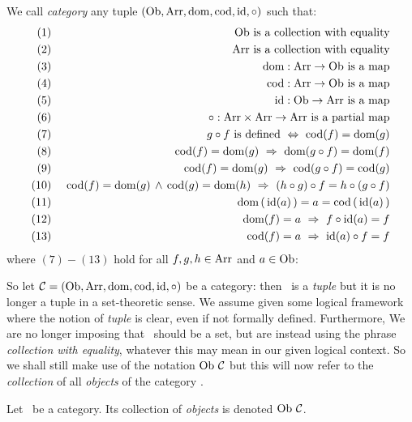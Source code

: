 \begin{defin}\label{Cat:def:category}
    We call {\em category} any tuple $(\mbox{\rm Ob}, \mbox{\rm Arr}, \mbox{\rm dom}, \mbox{\rm cod}, \mbox{\rm id}, \circ)$ 
    such that:
        \begin{eqnarray*}
            (1)&\ &\mbox{\rm Ob}\mbox{\ is a collection with equality}\\
            (2)&\ &\mbox{\rm Arr}\mbox{\ is a collection with equality}\\
            (3)&\ &\mbox{\rm dom}:\mbox{\rm Arr}\to\mbox{\rm Ob}\mbox{\ is a map}\\
            (4)&\ &\mbox{\rm cod}:\mbox{\rm Arr}\to\mbox{\rm Ob}\mbox{\ is a map}\\
            (5)&\ &\mbox{\rm id}:\mbox{\rm Ob}\to\mbox{\rm Arr}\mbox{\ is a map}\\
            (6)&\ &\circ:\mbox{\rm Arr}\times\mbox{\rm Arr}\to\mbox{\rm Arr}\mbox{\ is a partial map}\\
            (7)&\ &g\circ f\mbox{\ is defined}
                \ \Leftrightarrow\ \mbox{\rm cod}(f)=\mbox{\rm dom}(g) \\
            (8)&\ &\mbox{\rm cod}(f)=\mbox{\rm dom}(g)\ \Rightarrow\ \mbox{\rm dom}(g\circ f) = \mbox{\rm dom}(f)\\
            (9)&\ &\mbox{\rm cod}(f)=\mbox{\rm dom}(g)\ \Rightarrow\ \mbox{\rm cod}(g\circ f) = \mbox{\rm cod}(g)\\
            (10)&\ &\mbox{\rm cod}(f)=\mbox{\rm dom}(g)\,\land\,\mbox{\rm cod}(g)=\mbox{\rm dom}(h)
               \ \Rightarrow\ (h\circ g)\circ f = h\circ(g\circ f)\\
            (11)&\ &\mbox{\rm dom}\,(\,\mbox{\rm id}(a)\,) = a = \mbox{\rm cod}\,(\,\mbox{\rm id}(a)\,)\\
            (12)&\ &\mbox{\rm dom}(f)=a\ \Rightarrow\ f\circ\mbox{\rm id}(a) = f\\
            (13)&\ &\mbox{\rm cod}(f)=a\ \Rightarrow\ \mbox{\rm id}(a)\circ f = f
       \end{eqnarray*} 
    where $(7)-(13)$ hold for all $f,g,h\in\mbox{\rm Arr}$ and $a\in\mbox{\rm Ob}$: 
\end{defin}

\newpage
So let $\mbox{$\cal C$}=(\mbox{\rm Ob}, \mbox{\rm Arr}, \mbox{\rm dom}, \mbox{\rm cod}, \mbox{\rm id}, \circ)$ be a category: then \Cat\ is 
a {\em tuple} but it is no longer a tuple in a set-theoretic sense. We assume
given some logical framework where the notion of {\em tuple} is clear, even
if not formally defined. Furthermore, We are no longer imposing that \ob\ 
should be a set, but are instead using the phrase {\em collection with 
equality}, whatever this may mean in our given logical context. So we shall 
still make use of the notation $\ob\ \Cat$ but this will now refer to the 
{\em collection} of all {\em objects} of the category \Cat. 
\begin{notation}\label{Cat:notation:objects}
    Let \Cat\ be a category. Its collection of {\em objects} is denoted $\ob\ 
    \Cat$.
\end{notation}

